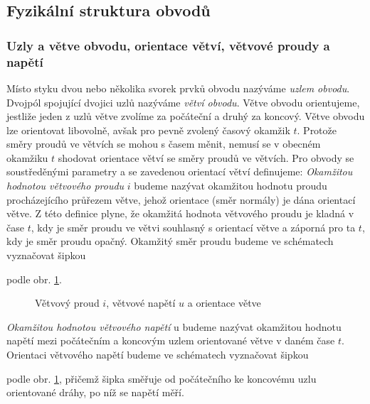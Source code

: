{      
    \subsection{Fyzikální struktura obvodů} 
      \subsubsection{Uzly a větve obvodu, orientace větví, větvové proudy a 
      napětí}\label{TEO:chap_Term}
        Místo styku dvou nebo několika svorek prvků obvodu nazýváme \emph{uzlem obvodu}. Dvojpól 
        spojující dvojici uzlů nazýváme \emph{větví obvodu}. Větve obvodu orientujeme, jestliže 
        jeden z uzlů větve zvolíme za počáteční a druhý za koncový. Větve obvodu lze orientovat 
        libovolně, avšak pro pevně zvolený časový okamžik \(t\). Protože směry proudů ve větvích se 
        mohou s časem měnit, nemusí se v obecném okamžiku \(t\) shodovat orientace větví se směry 
        proudů ve větvích. Pro obvody se soustředěnými parametry a se zavedenou orientací větví 
        definujeme: \emph{Okamžitou hodnotou větvového proudu} \(i\) budeme nazývat okamžitou 
        hodnotu proudu procházejícího průřezem větve, jehož orientace (směr normály) je dána 
        orientací větve. Z této definice plyne, že okamžitá hodnota větvového proudu je kladná v 
        čase \(t\), kdy je směr proudu ve větvi souhlasný s orientací větve a záporná pro ta \(t\), 
        kdy je směr proudu opačný. Okamžitý směr proudu budeme ve schématech vyznačovat šipkou 
         podle obr. 
        \ref{TEO:fig_dvojpol_iu}.
        
        \begin{figure}
          \centering
          
          \caption{Větvový proud \(i\), větvové napětí \(u\) a orientace větve}
          \label{TEO:fig_dvojpol_iu}
        \end{figure}

        \emph{Okamžitou hodnotou větvového napětí} u budeme nazývat okamžitou hodnotu napětí mezi 
        počátečním a koncovým uzlem orientované větve v daném čase \(t\). Orientaci větvového 
        napětí budeme ve schématech vyznačovat šipkou 
         podle obr. 
        \ref{TEO:fig_dvojpol_iu}, přičemž šipka směřuje od počátečního ke koncovému uzlu 
        orientované dráhy, po níž se napětí měří.
        
}
